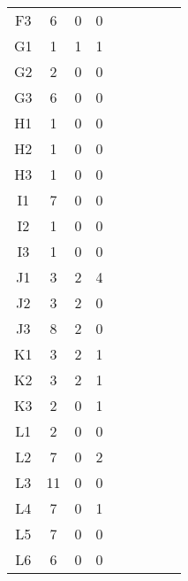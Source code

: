 \begin{center}
\begin{longtable}{ccccc|cccc}
    F3    & 6     & 0     & 0 \\
    G1    & 1     & 1     & 1 \\
    G2    & 2     & 0     & 0 \\
    G3    & 6     & 0     & 0 \\
    H1    & 1     & 0     & 0 \\
    H2    & 1     & 0     & 0 \\
    H3    & 1     & 0     & 0 \\
    I1    & 7     & 0     & 0 \\
    I2    & 1     & 0     & 0 \\
    I3    & 1     & 0     & 0 \\
    J1    & 3     & 2     & 4 \\
    J2    & 3     & 2     & 0 \\
    J3    & 8     & 2     & 0 \\
    K1    & 3     & 2     & 1 \\
    K2    & 3     & 2     & 1 \\
    K3    & 2     & 0     & 1 \\
    L1    & 2     & 0     & 0 \\
    L2    & 7     & 0     & 2 \\
    L3    & 11    & 0     & 0 \\
    L4    & 7     & 0     & 1 \\
    L5    & 7     & 0     & 0 \\
    L6    & 6     & 0     & 0 \\
\end{longtable}
\end{center}

